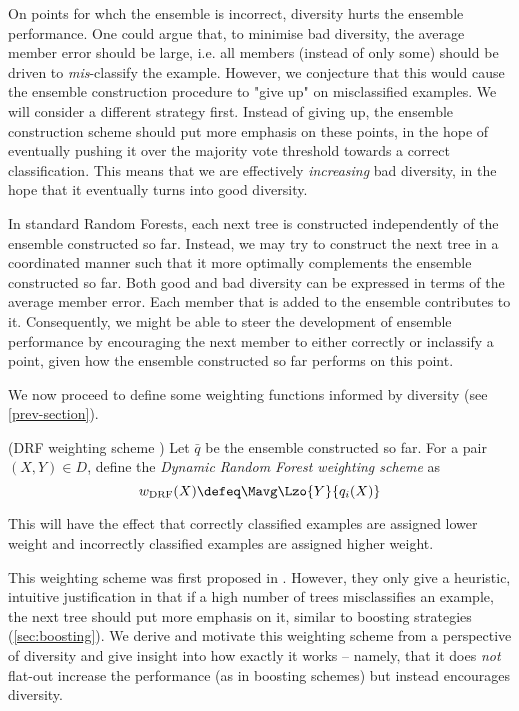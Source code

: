\documentclass[../main.tex]{subfiles}
\begin{document}
On points for whch the ensemble is incorrect, diversity hurts the ensemble performance. 
One could argue that, to minimise bad diversity, the average member error should be large, i.e. all members (instead of only some) should be driven to \textit{mis}-classify the example. However, we conjecture that this would cause the ensemble construction procedure to "give up" on misclassified examples. We will consider a different strategy first. Instead of giving up, the ensemble construction scheme should put more emphasis on these points, in the hope of eventually pushing it over the majority vote threshold towards a correct classification. This means that we are effectively \textit{increasing} bad diversity, in the hope that it eventually turns into good diversity.

In standard Random Forests, each next tree is constructed independently of the ensemble constructed so far. Instead, we may try to construct the next tree in a coordinated manner such that it more optimally complements the ensemble constructed so far. 
Both good and bad diversity can be expressed in terms of the average member error. Each member that is added to the ensemble contributes to it. Consequently, we might be able to steer the development of ensemble performance by encouraging the next member to either correctly or inclassify a point, given how the ensemble constructed so far performs on this point.



We now proceed to define some weighting functions informed by diversity (see \ref{prev-section}).
\marginnote{
   } 
\begin{definition} (DRF weighting scheme \cite{bernard-drf})
Let $\bar{q}$ be the ensemble constructed so far. For a pair $(X,Y) \in D$, define the \textit{Dynamic Random Forest weighting scheme} as 
$$
w_{\text{DRF}}(X) \defeq \Mavg \Lzo{Y}{q_{i}(X)}
$$
\label{def:drf-weighting-scheme}
\end{definition}
This will have the effect that correctly classified examples are assigned lower weight and incorrectly classified examples are assigned higher weight.  %


This weighting scheme was first proposed in \cite{bernard-drf}. However, they only give a heuristic, intuitive justification in that if a high number of trees misclassifies an example, the next tree should put more emphasis on it, similar to boosting strategies (\ref{sec:boosting}). We derive and motivate this weighting scheme from a perspective of diversity and give insight into how exactly it works -- namely, that it does \textit{not} flat-out increase the performance (as in boosting schemes) but instead encourages diversity.
\end{document}
